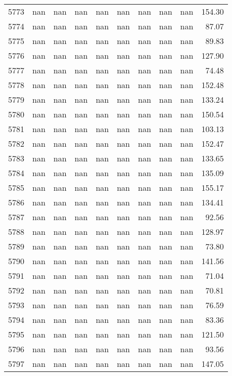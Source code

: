 \begin{tabular}{lrrrrrrrrr}
5773 & nan & nan & nan & nan & nan & nan & nan & nan & 154.30 \\
5774 & nan & nan & nan & nan & nan & nan & nan & nan & 87.07 \\
5775 & nan & nan & nan & nan & nan & nan & nan & nan & 89.83 \\
5776 & nan & nan & nan & nan & nan & nan & nan & nan & 127.90 \\
5777 & nan & nan & nan & nan & nan & nan & nan & nan & 74.48 \\
5778 & nan & nan & nan & nan & nan & nan & nan & nan & 152.48 \\
5779 & nan & nan & nan & nan & nan & nan & nan & nan & 133.24 \\
5780 & nan & nan & nan & nan & nan & nan & nan & nan & 150.54 \\
5781 & nan & nan & nan & nan & nan & nan & nan & nan & 103.13 \\
5782 & nan & nan & nan & nan & nan & nan & nan & nan & 152.47 \\
5783 & nan & nan & nan & nan & nan & nan & nan & nan & 133.65 \\
5784 & nan & nan & nan & nan & nan & nan & nan & nan & 135.09 \\
5785 & nan & nan & nan & nan & nan & nan & nan & nan & 155.17 \\
5786 & nan & nan & nan & nan & nan & nan & nan & nan & 134.41 \\
5787 & nan & nan & nan & nan & nan & nan & nan & nan & 92.56 \\
5788 & nan & nan & nan & nan & nan & nan & nan & nan & 128.97 \\
5789 & nan & nan & nan & nan & nan & nan & nan & nan & 73.80 \\
5790 & nan & nan & nan & nan & nan & nan & nan & nan & 141.56 \\
5791 & nan & nan & nan & nan & nan & nan & nan & nan & 71.04 \\
5792 & nan & nan & nan & nan & nan & nan & nan & nan & 70.81 \\
5793 & nan & nan & nan & nan & nan & nan & nan & nan & 76.59 \\
5794 & nan & nan & nan & nan & nan & nan & nan & nan & 83.36 \\
5795 & nan & nan & nan & nan & nan & nan & nan & nan & 121.50 \\
5796 & nan & nan & nan & nan & nan & nan & nan & nan & 93.56 \\
5797 & nan & nan & nan & nan & nan & nan & nan & nan & 147.05 \\

\end{tabular}
